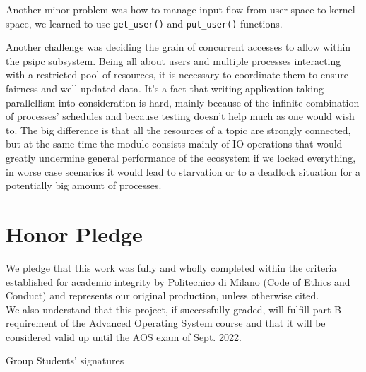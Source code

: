 \documentclass[10pt,a4]{article}
\newcommand{\code}[1]{\texttt{#1}}
\begin{document}
Another minor problem was how to manage input flow from user-space to kernel-space, we learned to use \code{get\_user()} and \code{put\_user()} functions.

Another challenge was deciding the grain of concurrent accesses to allow within the psipc subsystem. Being all about users and multiple processes interacting with a restricted pool of resources, it is necessary to coordinate them to ensure fairness and well updated data. It's a fact that writing application taking parallellism into consideration is hard, mainly because of the infinite combination of processes' schedules and because testing doesn't help much as one would wish to. The big difference is that all the resources of a topic are strongly connected, but at the same time the module consists mainly of IO operations that would greatly undermine general performance of the ecosystem if we locked everything, in worse case scenarios it would lead to starvation or to a deadlock situation for a potentially big amount of processes. %

\section{Honor Pledge}

We pledge that this work was fully and wholly completed within the criteria
established for academic integrity by Politecnico di Milano (Code of Ethics and
Conduct) and represents our original production, unless otherwise cited.\\
We also understand that this project, if successfully graded, will fulfill part B requirement of the
Advanced Operating System course and that it will be considered valid up until
the AOS exam of Sept. 2022. 

\begin{flushright}
Group Students' signatures
\end{flushright}
\end{document}
